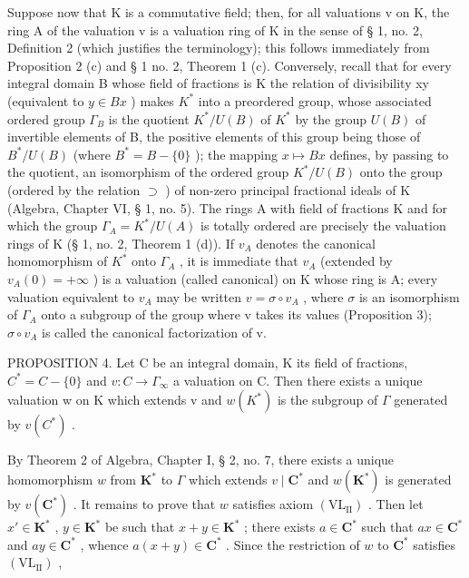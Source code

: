 Suppose now that K is a commutative field; then, for all valuations v on K, the ring A of the valuation v is a valuation ring of K in the sense of § 1, no. 2, Definition 2 (which justifies the terminology); this follows immediately from Proposition 2 (c) and § 1 no. 2, Theorem 1 (c). Conversely, recall that for every integral domain B whose field of fractions is K the relation of divisibility x\textbar y (equivalent to \(y \in Bx\) ) makes \(K^{*}\) into a preordered group, whose associated ordered group \(\Gamma_{B}\) is the quotient \(K^{*}/U(B)\) of \(K^{*}\) by the group \(U(B)\) of invertible elements of B, the positive elements of this group being those of \(B^{*}/U(B)\) (where \(B^{*} = B - \{0\}\) ); the mapping \(x \mapsto Bx\) defines, by passing to the quotient, an isomorphism of the ordered group \(K^{*}/U(B)\) onto the group (ordered by the relation \(\supset\) ) of non-zero principal fractional ideals of K (Algebra, Chapter VI, § 1, no. 5). The rings A with field of fractions K and for which the group \(\Gamma_{A} = K^{*}/U(A)\) is totally ordered are precisely the valuation rings of K (§ 1, no. 2, Theorem 1 (d)). If \(v_{A}\) denotes the canonical homomorphism of \(K^{*}\) onto \(\Gamma_{A}\) , it is immediate that \(v_{A}\) (extended by \(v_{A}(0) = +\infty\) ) is a valuation (called canonical) on K whose ring is A; every valuation equivalent to \(v_{A}\) may be written \(v = \sigma \circ v_{A}\) , where \(\sigma\) is an isomorphism of \(\Gamma_{A}\) onto a subgroup of the group where v takes its values (Proposition 3); \(\sigma \circ v_{A}\) is called the canonical factorization of v.

PROPOSITION 4. Let C be an integral domain, K its field of fractions, \(C^{*} = C - \{0\}\) and \(v: C \to \Gamma_{\infty}\) a valuation on C. Then there exists a unique valuation w on K which extends v and \(w(K^{*})\) is the subgroup of \(\Gamma\) generated by \(v(C^{*})\) .

By Theorem 2 of Algebra, Chapter I, § 2, no. 7, there exists a unique homomorphism \(w\) from \(\mathbf{K}^*\) to \(\Gamma\) which extends \(v \mid \mathbf{C}^*\) and \(w(\mathbf{K}^*)\) is generated by \(v(\mathbf{C}^*)\) . It remains to prove that \(w\) satisfies axiom \((\mathrm{VL}_{\mathrm{II}})\) . Then let \(x' \in \mathbf{K}^*\) , \(y \in \mathbf{K}^*\) be such that \(x + y \in \mathbf{K}^*\) ; there exists \(a \in \mathbf{C}^*\) such that \(ax \in \mathbf{C}^*\) and \(ay \in \mathbf{C}^*\) , whence \(a(x + y) \in \mathbf{C}^*\) . Since the restriction of \(w\) to \(\mathbf{C}^*\) satisfies \((\mathrm{VL}_{\mathrm{II}})\) ,

